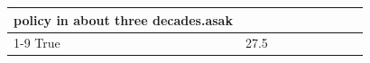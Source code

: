 \begin{table}[H]
\begin{tabular}{lllrlllll}
policy in about three decades.asak \\
\cline{1-9}
True & 27.5%
\end{tabular}
\end{table}

